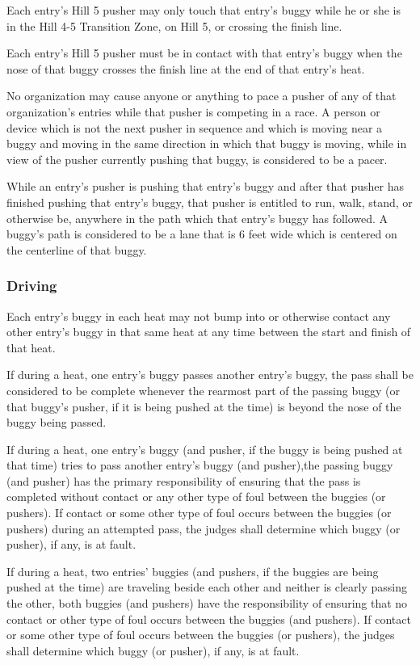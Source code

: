 \documentclass[openany]{book}
\begin{document}
Each entry's Hill 5 pusher may only touch that entry's buggy while he or she is in the Hill 4-5 Transition Zone, on Hill 5, or crossing the finish line.

Each entry's Hill 5 pusher must be in contact with that entry's buggy when the nose of that buggy crosses the finish line at the end of that entry's heat.

No organization may cause anyone or anything to pace a pusher of any of that organization's entries while that pusher is competing in a race. A person or device which is not the next pusher in sequence and which is moving near a buggy and moving in the same direction in which that buggy is moving, while in view of the pusher currently pushing that buggy, is considered to be a pacer.

While an entry's pusher is pushing that entry's buggy and after that pusher has finished pushing that entry's buggy, that pusher is entitled to run, walk, stand, or otherwise be, anywhere in the path which that entry's buggy has followed. A buggy's path is considered to be a lane that is 6 feet wide which is centered on the centerline of that buggy.

\subsubsection{Driving}

Each entry's buggy in each heat may not bump into or otherwise contact any other entry's buggy in that same heat at any time between the start and finish of that heat.

If during a heat, one entry's buggy passes another entry's buggy, the pass shall be considered to be complete whenever the rearmost part of the passing buggy (or that buggy's pusher, if it is being pushed at the time) is beyond the nose of the buggy being passed.

If during a heat, one entry's buggy (and pusher, if the buggy is being pushed at that time) tries to pass another entry's buggy (and pusher),the passing buggy (and pusher) has the primary responsibility of ensuring that the pass is completed without contact or any other type of foul between the buggies (or pushers). If contact or some other type of foul occurs between the buggies (or pushers) during an attempted pass, the judges shall determine which buggy (or pusher), if any, is at fault.

If during a heat, two entries' buggies (and pushers, if the buggies are being pushed at the time) are traveling beside each other and neither is clearly passing the other, both buggies (and pushers) have the responsibility of ensuring that no contact or other type of foul occurs between the buggies (and pushers). If contact or some other type of foul occurs between the buggies (or pushers), the judges shall determine which buggy (or pusher), if any, is at fault.
\end{document}
